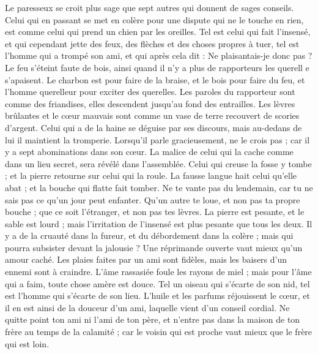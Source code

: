 \begin{multicols}{2}
Le paresseux se croit plus sage que sept autres qui donnent de sages conseils.
Celui qui en passant se met en colère pour une dispute qui ne le touche en rien, est comme celui qui prend un chien par les oreilles.
Tel est celui qui fait l'insensé, et qui cependant jette des feux, des flèches et des choses propres à tuer,
tel est l'homme qui a trompé son ami, et qui après cela dit : Ne plaisantais-je donc pas ?
Le feu s'éteint faute de bois, ainsi quand il n'y a plus de rapporteurs les querell e s'apaisent.
Le charbon est pour faire de la braise, et le bois pour faire du feu, et l'homme querelleur pour exciter des querelles.
Les paroles du rapporteur sont comme des friandises, elles descendent jusqu'au fond des entrailles.
Les lèvres brûlantes et le cœur mauvais sont comme un vase de terre recouvert de scories d'argent.
Celui qui a de la haine se déguise par ses discours, mais au-dedans de lui il maintient la tromperie.
Lorsqu'il parle gracieusement, ne le crois pas ; car il y a sept abominations dans son cœur.
La malice de celui qui la cache comme dans un lieu secret, sera révélé dans l'assemblée.
Celui qui creuse la fosse y tombe ; et la pierre retourne sur celui qui la roule.
La fausse langue hait celui qu'elle abat ; et la bouche qui flatte fait tomber.
\VerseOne{}Ne te vante pas du lendemain, car tu ne sais pas ce qu'un jour peut enfanter.
Qu'un autre te loue, et non pas ta propre bouche ; que ce soit l'étranger, et non pas tes lèvres.
La pierre est pesante, et le sable est lourd ; mais l'irritation de l'insensé est plus pesante que tous les deux.
Il y a de la cruauté dans la fureur, et du débordement dans la colère ; mais qui pourra subsister devant la jalousie ?
Une réprimande ouverte vaut mieux qu'un amour caché.
Les plaies faites par un ami sont fidèles, mais les baisers d'un ennemi sont à craindre.
L'âme rassasiée foule les rayons de miel ; mais pour l'âme qui a faim, toute chose amère est douce.
Tel un oiseau qui s'écarte de son nid, tel est l'homme qui s'écarte de son lieu.
L'huile et les parfums réjouissent le cœur, et il en est ainsi de la douceur d'un ami, laquelle vient d'un conseil cordial.
Ne quitte point ton ami ni l'ami de ton père, et n'entre pas dans la maison de ton frère au temps de la calamité ; car le voisin qui est proche vaut mieux que le frère qui est loin.

\end{multicols}
